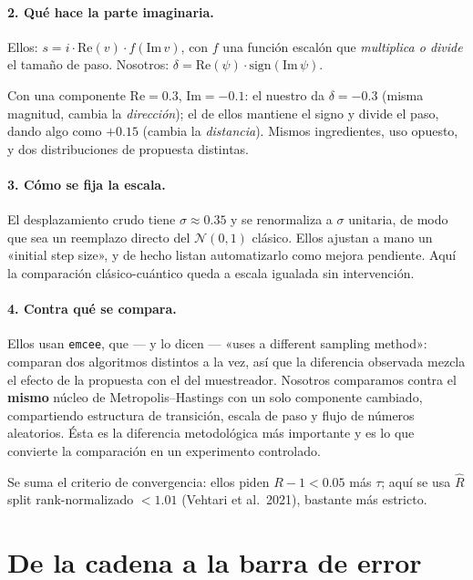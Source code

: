 \documentclass[11pt,a4paper]{article}
\begin{document}
\paragraph{2. Qué hace la parte imaginaria.} Ellos:
$s = i\cdot\mathrm{Re}(v)\cdot f(\mathrm{Im}\,v)$, con $f$ una función
escalón que \emph{multiplica o divide} el tamaño de paso. Nosotros:
$\delta = \mathrm{Re}(\psi)\cdot\mathrm{sign}(\mathrm{Im}\,\psi)$.

Con una componente $\mathrm{Re}=0.3$, $\mathrm{Im}=-0.1$: el nuestro da
$\delta = -0.3$ (misma magnitud, cambia la \emph{dirección}); el de ellos
mantiene el signo y divide el paso, dando algo como $+0.15$ (cambia la
\emph{distancia}). Mismos ingredientes, uso opuesto, y dos distribuciones
de propuesta distintas.

\paragraph{3. Cómo se fija la escala.} El desplazamiento crudo tiene
$\sigma \approx 0.35$ y se renormaliza a $\sigma$ unitaria, de modo que sea
un reemplazo directo del $\mathcal{N}(0,1)$ clásico. Ellos ajustan a mano
un «initial step size», y de hecho listan automatizarlo como mejora
pendiente. Aquí la comparación clásico-cuántico queda a escala igualada sin
intervención.

\paragraph{4. Contra qué se compara.} Ellos usan \texttt{emcee}, que --- y
lo dicen --- «uses a different sampling method»: comparan dos algoritmos
distintos a la vez, así que la diferencia observada mezcla el efecto de la
propuesta con el del muestreador. Nosotros comparamos contra el
\textbf{mismo} núcleo de Metropolis--Hastings con un solo componente
cambiado, compartiendo estructura de transición, escala de paso y flujo de
números aleatorios. Ésta es la diferencia metodológica más importante y es
lo que convierte la comparación en un experimento controlado.

Se suma el criterio de convergencia: ellos piden $R-1 < 0.05$ más $\tau$;
aquí se usa $\hat{R}$ split rank-normalizado $< 1.01$ (Vehtari et al.\
2021), bastante más estricto.

\clearpage
\section{De la cadena a la barra de error}
\end{document}
